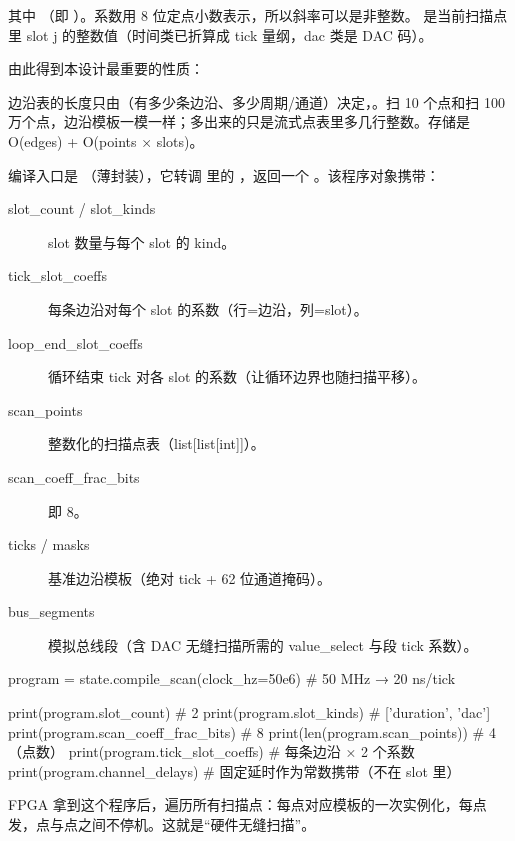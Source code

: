 \documentclass[11pt,oneside,openany]{book}
\begin{document}
其中 （即 ）。系数用 8 位定点小数表示，所以斜率可以是非整数。 是当前扫描点里 slot j 的整数值（时间类已折算成 tick 量纲，dac 类是 DAC 码）。

由此得到本设计最重要的性质：

\begin{notebox}[大扫描不会撑大边沿表]
边沿表的长度只由（有多少条边沿、多少周期/通道）决定，。扫 10 个点和扫 100 万个点，边沿模板一模一样；多出来的只是流式点表里多几行整数。存储是 O(edges) + O(points × slots)。
\end{notebox}

编译入口是 （薄封装），它转调  里的 ，返回一个 。该程序对象携带：

\begin{description}
\item[slot\_count / slot\_kinds] slot 数量与每个 slot 的 kind。
\item[tick\_slot\_coeffs] 每条边沿对每个 slot 的系数（行=边沿，列=slot）。
\item[loop\_end\_slot\_coeffs] 循环结束 tick 对各 slot 的系数（让循环边界也随扫描平移）。
\item[scan\_points] 整数化的扫描点表（list[list[int]]）。
\item[scan\_coeff\_frac\_bits] 即 8。
\item[ticks / masks] 基准边沿模板（绝对 tick + 62 位通道掩码）。
\item[bus\_segments] 模拟总线段（含 DAC 无缝扫描所需的 value\_select 与段 tick 系数）。
\end{description}

\begin{codeblock}[Python]
program = state.compile_scan(clock_hz=50e6)   # 50 MHz → 20 ns/tick

print(program.slot_count)            # 2
print(program.slot_kinds)            # ['duration', 'dac']
print(program.scan_coeff_frac_bits)  # 8
print(len(program.scan_points))      # 4（点数）
print(program.tick_slot_coeffs)      # 每条边沿 × 2 个系数
print(program.channel_delays)        # 固定延时作为常数携带（不在 slot 里）
\end{codeblock}

FPGA 拿到这个程序后，遍历所有扫描点：每点对应模板的一次实例化，每点发，点与点之间不停机。这就是“硬件无缝扫描”。
\end{document}
